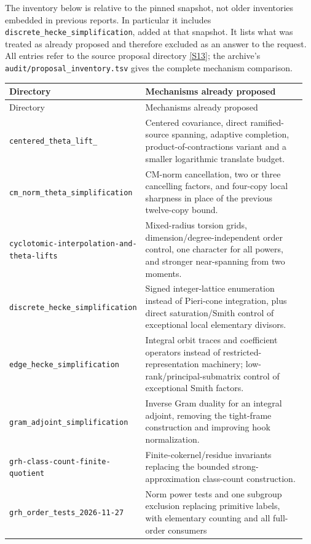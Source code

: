 \documentclass[11pt,letterpaper]{article}
\theoremstyle{remark}
\newcommand{\code}[1]{{\small\nolinkurl{#1}}}
\newcommand{\src}[1]{\hyperref[src:#1]{[S#1]}}
\begin{document}
The inventory below is relative to the pinned snapshot, not older inventories
embedded in previous reports. In particular it includes
\code{discrete_hecke_simplification}, added at that snapshot. It lists what was
treated as already proposed and therefore excluded as an answer to the request.
All entries refer to the source proposal directory \src{13}; the archive's
\code{audit/proposal_inventory.tsv} gives the complete mechanism comparison.

\small
\begin{longtable}{@{}p{0.36\linewidth}p{0.60\linewidth}@{}}
\toprule
Directory & Mechanisms already proposed\\
\midrule
\endfirsthead
\toprule Directory & Mechanisms already proposed\\\midrule
\endhead
\bottomrule\endfoot
\code{centered_theta_lift_}\newline\code{simplification} & Centered covariance, direct ramified-source
spanning, adaptive completion, product-of-contractions variant and a smaller
logarithmic translate budget.\\[5pt]
\code{cm_norm_theta_simplification} & CM-norm cancellation, two or three cancelling
factors, and four-copy local sharpness in place of the previous twelve-copy bound.\\[5pt]
\code{cyclotomic-interpolation-and-theta-lifts} & Mixed-radius torsion grids,
dimension/degree-independent order control, one character for all powers, and
stronger near-spanning from two moments.\\[5pt]
\code{discrete_hecke_simplification} & Signed integer-lattice enumeration instead
of Pieri-cone integration, plus direct saturation/Smith control of exceptional
local elementary divisors.\\[5pt]
\code{edge_hecke_simplification} & Integral orbit traces and coefficient operators
instead of restricted-representation machinery; low-rank/principal-submatrix
control of exceptional Smith factors.\\[5pt]
\code{gram_adjoint_simplification} & Inverse Gram duality for an integral adjoint,
removing the tight-frame construction and improving hook normalization.\\[5pt]
\code{grh-class-count-finite-quotient} & Finite-cokernel/residue invariants replacing
the bounded strong-approximation class-count construction.\\[5pt]
\code{grh_order_tests_2026-11-27} & Norm power tests and one subgroup exclusion
replacing primitive labels, with elementary counting and all full-order consumers

\end{longtable}
\end{document}
